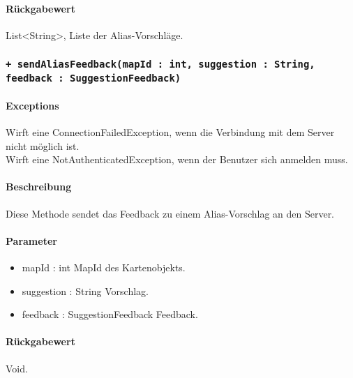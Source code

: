 \paragraph*{Rückgabewert}
List<String>, Liste der Alias-Vorschläge.

\subsubsection*{\texttt{+ sendAliasFeedback(mapId : int, suggestion : String, feedback : SuggestionFeedback)}}%
\paragraph*{Exceptions}
Wirft eine ConnectionFailedException, wenn die Verbindung mit dem Server nicht möglich ist.\\
Wirft eine NotAuthenticatedException, wenn der Benutzer sich anmelden muss.
\paragraph*{Beschreibung}
Diese Methode sendet das Feedback zu einem Alias-Vorschlag an den Server.
\paragraph*{Parameter}
\begin{itemize}
    \item mapId : int MapId des Kartenobjekts.
    \item suggestion : String Vorschlag. 
    \item feedback : SuggestionFeedback Feedback.
\end{itemize}
\paragraph*{Rückgabewert}
Void.